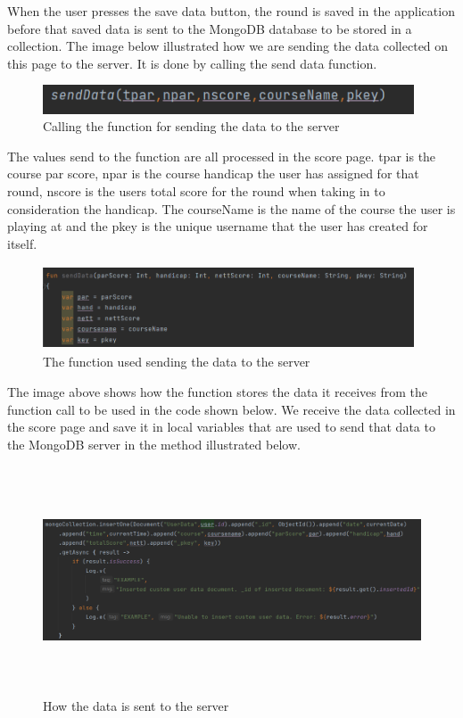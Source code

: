 When the user presses the save data button, the round is saved in the application before that saved data is sent to the MongoDB database to be stored in a collection.
\newpage
The image below illustrated how we are sending the data collected on this page to the server. It is done by calling the send data function.
\begin{figure}[H]
    \centering
    \includegraphics[width=11cm]{img/sendDataFCall.PNG}
    \caption{Calling the function for sending the data to the server}
    \label{fig:altas config}
\end{figure}
The values send to the function are all processed in the score page. tpar is the course par score, npar is the course handicap the user has assigned for that round, nscore is the users total score for the round when taking in to consideration the handicap. The courseName is the name of the course the user is playing at and the pkey is the unique username that the user has created for itself.
\begin{figure}[H]
    \centering
    \includegraphics[width=11cm, height = 2.5cm]{img/sendDataFunction.PNG}
    \caption{The function used sending the data to the server}
    \label{fig:altas config}
\end{figure}
The image above shows how the function stores the data it receives from the function call to be used in the code shown below. We receive the data collected in the score page and save it in local variables that are used to send that data to the MongoDB server in the method illustrated below.
\begin{figure}[H]
    \centering
    \includegraphics[width=15cm, height = 6.75cm]{img/sendServer.PNG}
    \caption{How the data is sent to the server}
    \label{fig:altas config}
\end{figure}
